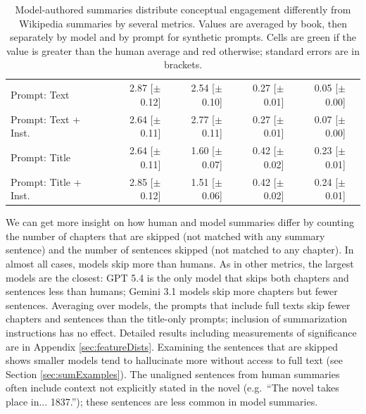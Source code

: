 \documentclass{article} %
\begin{document}
\begin{table}
\begin{tabular}{lrrrrr}
    \midrule
    Prompt: Text & \cellcolor{palegreen}2.87 [$\pm$ 0.12] & \cellcolor{palered}2.54 [$\pm$ 0.10] & \cellcolor{palegreen}0.27 [$\pm$ 0.01] & \cellcolor{palered}0.05 [$\pm$ 0.00] \\
    Prompt: Text + Inst. & \cellcolor{palegreen}2.64 [$\pm$ 0.11] & \cellcolor{palegreen}2.77 [$\pm$ 0.11] & \cellcolor{palegreen}0.27 [$\pm$ 0.01] & \cellcolor{palered}0.07 [$\pm$ 0.00] \\
    Prompt: Title & \cellcolor{palegreen}2.64 [$\pm$ 0.11] & \cellcolor{palered}1.60 [$\pm$ 0.07] & \cellcolor{palegreen}0.42 [$\pm$ 0.02] & \cellcolor{palegreen}0.23 [$\pm$ 0.01] \\
    Prompt: Title + Inst. & \cellcolor{palegreen}2.85 [$\pm$ 0.12] & \cellcolor{palered}1.51 [$\pm$ 0.06] & \cellcolor{palegreen}0.42 [$\pm$ 0.02] & \cellcolor{palegreen}0.24 [$\pm$ 0.01] \\
    \bottomrule
  \end{tabular}
  \caption{Model-authored summaries distribute conceptual engagement differently from Wikipedia summaries by several metrics. Values are averaged by book, then separately by model and by prompt for synthetic prompts. Cells are green if the value is greater than the human average and red otherwise; standard errors are in brackets.}
  \label{tab:sentAssign}
  \vspace{-10pt}
\end{table}

We can get more insight on how human and model summaries differ by counting the number of chapters that are skipped (not matched with any summary sentence) and the number of sentences skipped (not matched to any chapter).
In almost all cases, models skip more than humans.
As in other metrics, the largest models are the closest:
GPT 5.4 is the only model that skips both chapters and sentences less than humans; Gemini 3.1 models skip more chapters but fewer sentences.
Averaging over models, the prompts that include full texts skip fewer chapters and sentences than the title-only prompts; inclusion of summarization instructions has no effect.
Detailed results including measurements of significance are in Appendix \ref{sec:featureDists}. Examining the sentences that are skipped shows smaller models tend to hallucinate more without access to full text (see Section \ref{sec:sumExamples}).
The unaligned sentences from human summaries often include context not explicitly stated in the novel (e.g.\ ``The novel takes place in... 1837.''); these sentences are less common in model summaries.
\end{document}
